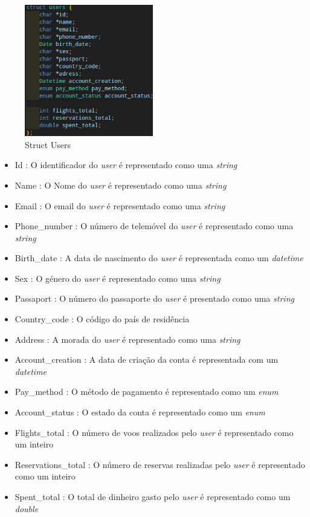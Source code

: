 \documentclass[11pt]{article}
\begin{document}
    \begin{figure}[hbt!]
        \centering
        \includegraphics[width=0.5\textwidth]{Imagens/struct users.png}
        \caption{Struct Users}
        \label{fig:example}
    \end{figure}
    \newpage
     \begin{itemize}
                \item Id : O identificador do \textit{user} é representado como uma \textit{string}
                \item Name : O Nome do \textit{user} é representado como uma \textit{string}
                \item Email : O email do \textit{user} é representado como uma \textit{string}
                \item Phone_number : O número de telemóvel do \textit{user} é representado como uma \textit{string}
                \item Birth_date : A data de nascimento do \textit{user} é representada como um \textit{datetime}
                \item Sex : O género do \textit{user} é representado como uma \textit{string}
                \item Passaport : O número do passaporte do \textit{user} é presentado como uma \textit{string}
                \item Country_code : O código do país de residência
                \item Address : A morada do \textit{user} é representado como uma \textit{string}
                \item Account_creation : A data de criação da conta é representada com um \textit{datetime}
                \item Pay_method : O método de pagamento é representado como um \textit{enum} 
                \item Account_status : O estado da conta é representado como um \textit{enum} 
                \item Flights_total : O número de voos realizados pelo \textit{user} é representado como um inteiro
                \item Reservations_total : O número de reservas realizadas pelo \textit{user} é representado como um inteiro
                \item Spent_total : O total de dinheiro gasto pelo \textit{user} é representado como um \textit{double}
        \end{itemize}
\newpage
\end{document}
